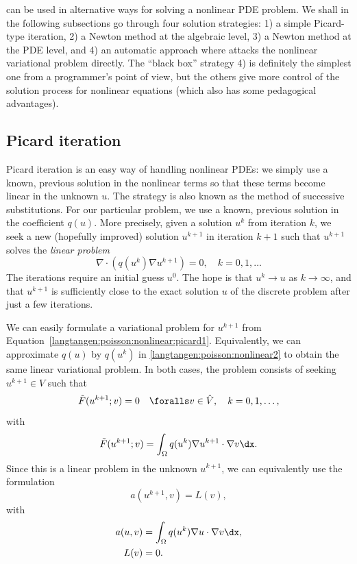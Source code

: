 \fenics{} can be used in alternative ways for solving a nonlinear PDE
problem. We shall in the following subsections go through four
solution strategies:
1) a simple Picard-type iteration,
2) a Newton method at the algebraic level,
3) a Newton method at the PDE level, and
4) an automatic approach where \fenics{} attacks the nonlinear variational
problem directly. The ``black box'' strategy 4) is definitely the
simplest one from a
programmer's point of view, but the others give more control of the
solution process for nonlinear equations (which also has some
pedagogical advantages).

\subsection{Picard iteration}
\label{langtangen:nonlinear:Picard}

Picard iteration is an easy way of handling nonlinear PDEs: we simply
use a known, previous solution in the nonlinear terms so that these
terms become linear in the unknown $u$. The strategy is also known as
the method of successive substitutions.
For our particular problem,
we use a known, previous solution in the coefficient $q(u)$.
More precisely, given a solution $u^k$ from iteration $k$, we seek a
new (hopefully improved) solution $u^{k+1}$ in iteration $k+1$ such
that $u^{k+1}$ solves the \emph{linear problem}
\begin{equation}
\label{langtangen:poisson:nonlinear:picard1}
\nabla\cdot \left(q(u^k)\nabla u^{k+1}\right) = 0,\quad k=0,1,\ldots
\end{equation}
The iterations require an initial guess $u^0$.
The hope is that $u^{k} \rightarrow u$ as $k\rightarrow\infty$, and that
$u^{k+1}$ is sufficiently close to the exact
solution $u$ of the discrete problem after just a few iterations.

We can easily formulate a variational problem for $u^{k+1}$ from
Equation~\eqref{langtangen:poisson:nonlinear:picard1}.
Equivalently, we can approximate $q(u)$ by $q(u^k)$ in
\eqref{langtangen:poisson:nonlinear2}
to obtain the same linear variational problem.
In both cases, the problem consists of seeking
$u^{k+1} \in V$ such that
\begin{equation} \label{langtangen:poisson:nonlinear:picard2}
  \tilde F(u^{k+1}; v) = 0 \quad \foralls v \in \hat{V},\quad k=0,1,\ldots,
\end{equation}
with
\begin{equation}
\label{langtangen:poisson:nonlinear:picard3}
\tilde F(u^{k+1}; v) = \int_\Omega q(u^k)\nabla u^{k+1}\cdot \nabla v\dx
.
\end{equation}
Since this is a linear problem in the unknown $u^{k+1}$, we can equivalently
use the formulation
\begin{equation}
a(u^{k+1},v) = L(v),
\end{equation}
with
\begin{align}
a(u,v) &= \int_\Omega q(u^k)\nabla u\cdot \nabla v\dx,
\\
L(v) &= 0.
\end{align}

